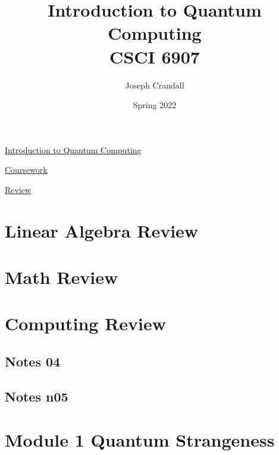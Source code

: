 
\usepackage{algorithm, algpseudocode, color, gensymb, siunitx, soul, subfiles}
\usepackage[a4paper, total={7.5in, 10in}]{geometry}

\title{Introduction to Quantum Computing\\
\large CSCI 6907}
\author{Joseph Crandall}
\date{Spring 2022}


\maketitle

\href{https://www2.seas.gwu.edu/~simhaweb/quantum/index.html}{Introduction to Quantum Computing}

\href{https://www2.seas.gwu.edu/~simhaweb/quantum/coursework.html}{Coursework}


\href{https://www2.seas.gwu.edu/~simhaweb/quantum/modules/review/review.html}{Review}

\section{Linear Algebra Review}


\section{Math Review}


\section{Computing Review}


\subsection{Notes 04}


\subsection{Notes n05}


\section{Module 1 Quantum Strangeness}


